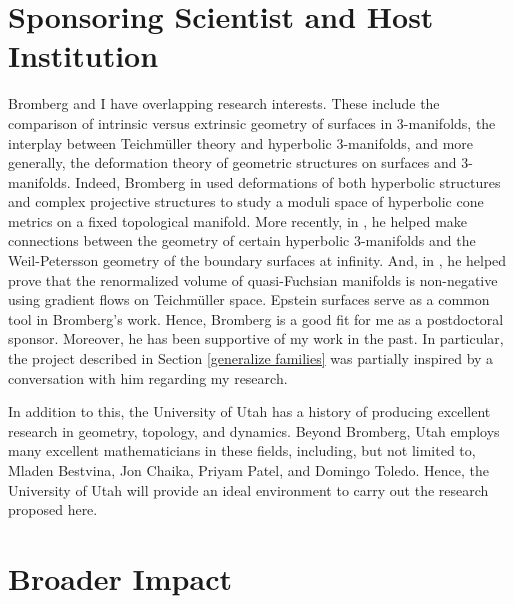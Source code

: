 \documentclass[11pt]{amsart}
\begin{document}
\section{Sponsoring Scientist and Host Institution}
Bromberg and I have overlapping research interests. These include the comparison of intrinsic versus extrinsic geometry of surfaces in 3-manifolds, the interplay between Teichm\"uller theory and hyperbolic 3-manifolds, and more generally, the deformation theory of geometric structures on surfaces and 3-manifolds. Indeed, Bromberg in \cite{bromberg2004} used deformations of both hyperbolic structures and complex projective structures to study a moduli space of hyperbolic cone metrics on a fixed topological manifold. More recently, in \cite{brock-bromberg2016}, he helped make connections between the geometry of certain hyperbolic 3-manifolds and the Weil-Petersson geometry of the boundary surfaces at infinity. And, in \cite{bridgeman-brock-bromberg2019}, he helped prove that the renormalized volume of quasi-Fuchsian manifolds is non-negative using gradient flows on Teichm\"uller space. Epstein surfaces serve as a common tool in Bromberg's work. Hence, Bromberg is a good fit for me as a postdoctoral sponsor. Moreover, he has been supportive of my work in the past. In particular, the project described in Section \ref{generalize families} was partially inspired by a conversation with him regarding my research.

In addition to this, the University of Utah has a history of producing excellent research in geometry, topology, and dynamics. Beyond Bromberg, Utah employs many excellent mathematicians in these fields, including, but not limited to, Mladen Bestvina, Jon Chaika, Priyam Patel, and Domingo Toledo. Hence, the University of Utah will provide an ideal environment to carry out the research proposed here. 


\section{Broader Impact}
\end{document}
